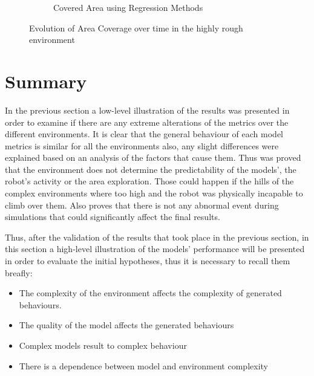\documentclass[msc,ai,logo]{infthesis}
\begin{document}
\begin{figure}[H]
\begin{subfigure}[b]{0.49\textwidth}
                \caption{Covered Area using Regression Methods}
               \label{fig:LR_15_AREA}  
        \end{subfigure}
        \caption{Evolution of Area Coverage over time in the highly rough environment}
         \label{fig:15_AREA}
\end{figure}

\section{Summary}

In the previous section a low-level illustration of the results was presented in order to examine if there are any extreme alterations of the metrics over the different environments. It is clear that the general behaviour of each model metrics is similar for all the environments also, any slight differences were explained based on an analysis of the factors that cause them. Thus was proved  that the environment does not determine the predictability of the models', the robot's activity or the area exploration. Those could happen if the hills of the complex environments where too high and the robot was physically incapable to climb over them. Also proves that there is not any abnormal event during simulations that could significantly affect the final results.     

Thus, after the validation of the results that took place in the previous section, in this section a high-level illustration of the models' performance will be presented in order to evaluate the initial hypotheses, thus it is necessary to recall them breafly:
\begin{itemize}
\item The complexity of the environment affects the complexity of generated behaviours.
\end{itemize}

\begin{itemize}
\item The quality of the model affects the generated behaviours
\end{itemize}
\begin{itemize}
\item Complex models result to complex behaviour 
\end{itemize}
\begin{itemize}
\item There is a dependence between model and environment complexity
\end{itemize}
\end{document}
